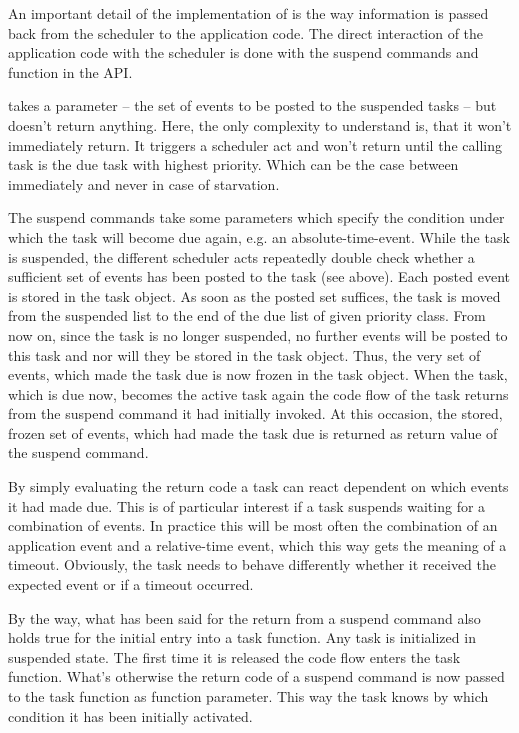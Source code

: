 An important detail of the implementation of \rtos{} is the way
information is passed back from the scheduler to the application code. The
direct interaction of the application code with the scheduler is done with the
suspend commands and function  in the \rtos{} API.

 takes a parameter -- the set of events to be posted to
the suspended tasks -- but doesn't return anything. Here, the only
complexity to understand is, that it won't immediately return. It triggers
a scheduler act and won't return until the calling task is the due task
with highest priority. Which can be the case between immediately and never
in case of starvation.

The suspend commands take some parameters which specify the condition
under which the task will become due again, e.g. an absolute-time-event.
While the task is suspended, the different scheduler acts repeatedly double
check whether a sufficient set of events has been posted to the task (see
above). Each posted event is stored in the task object. As soon as the
posted set suffices, the task is moved from the suspended list to the end
of the due list of given priority class. From now on, since the task is no
longer suspended, no further events will be posted to this task and nor
will they be stored in the task object. Thus, the very set of events, which
made the task due is now frozen in the task object. When the task, which
is due now, becomes the active task again the code flow of the task
returns from the suspend command it had initially invoked. At this
occasion, the stored, frozen set of events, which had made the task due is
returned as return value of the suspend command.

By simply evaluating the return code a task can react dependent on which
events it had made due. This is of particular interest if a task suspends
waiting for a combination of events. In practice this will be most often
the combination of an application event and a relative-time event, which
this way gets the meaning of a timeout. Obviously, the task needs to
behave differently whether it received the expected event or if a timeout
occurred.

By the way, what has been said for the return from a suspend command also
holds true for the initial entry into a task function. Any task is
initialized in suspended state. The first time it is released the code
flow enters the task function. What's otherwise the return code of a
suspend command is now passed to the task function as function parameter.
This way the task knows by which condition it has been initially
activated.

